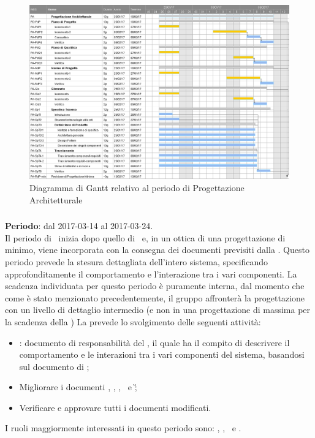 		\begin{figure}[ht]
			\centering
			\includegraphics[scale=0.34]{img/ganttnetbreak2.png}
			\caption{Diagramma di Gantt relativo al periodo di Progettazione Architetturale}
		\end{figure}
		\FloatBarrier
	
		\subsubsection{\PD}
		\textbf{Periodo}: dal 2017-03-14 al 2017-03-24.\\
		Il periodo di \PD\ inizia dopo quello di \PA\ e, in un ottica di una progettazione di minimo, viene incorporata con la consegna dei documenti previsiti dalla \RQ. Questo periodo prevede la stesura dettagliata dell’intero sistema, specificando approfonditamente
		il comportamento e l’interazione tra i vari componenti. La scadenza individuata per questo periodo è puramente interna, dal momento che come è stato menzionato precedentemente, il gruppo \gruppo affronterà la progettazione con un livello di dettaglio intermedio (e non in una progettazione di massima per la scadenza della \RP)
		La \PD prevede lo svolgimento delle seguenti attività:
		\begin{itemize}
			\item \textit{\DDP}: documento di responsabilità del \textit{\Prog}, il quale ha il compito di descrivere il comportamento	e le interazioni tra i vari componenti del sistema, basandosi sul documento di \ST;
			\item  Migliorare i documenti \NdP, \PdP, \PdQ, \ST\ e \G;
			\item Verificare e approvare tutti i documenti modificati.
		\end{itemize}
		I ruoli maggiormente interessati in questo periodo sono: \textit{\Amm}, \textit{\Res}, \textit{\Prog}\ e \textit{\Ver}.
		
